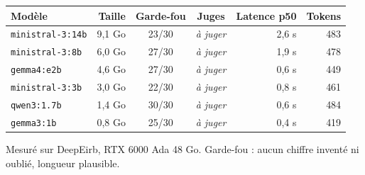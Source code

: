 \centering\small
\begin{tabular}{@{}l r c c r r@{}}
\toprule
\textbf{Modèle} & \textbf{Taille} & \textbf{Garde-fou} & \textbf{Juges} & \textbf{Latence p50} & \textbf{Tokens} \\
\midrule
\texttt{ministral-3:14b} & 9,1 Go & 23/30 & \textit{à juger} & 2,6 s & 483 \\
\texttt{ministral-3:8b} & 6,0 Go & 27/30 & \textit{à juger} & 1,9 s & 478 \\
\texttt{gemma4:e2b} & 4,6 Go & 27/30 & \textit{à juger} & 0,6 s & 449 \\
\texttt{ministral-3:3b} & 3,0 Go & 22/30 & \textit{à juger} & 0,8 s & 461 \\
\texttt{qwen3:1.7b} & 1,4 Go & 30/30 & \textit{à juger} & 0,6 s & 484 \\
\texttt{gemma3:1b} & 0,8 Go & 25/30 & \textit{à juger} & 0,4 s & 419 \\
\bottomrule
\end{tabular}

\medskip
{\scriptsize Mesuré sur DeepEirb, RTX 6000 Ada 48 Go. Garde-fou : aucun chiffre inventé ni oublié, longueur plausible.}
